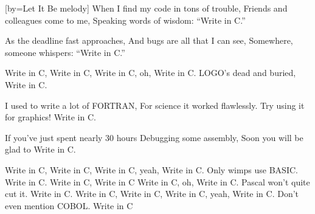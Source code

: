 [by={Let It Be melody}]
\beginverse
When I find my code in tons of trouble,
Friends and colleagues come to me,
Speaking words of wisdom:
``Write in C.''
\endverse

\beginverse
As the deadline fast approaches,
And bugs are all that I can see,
Somewhere, someone whispers:
``Write in C.''
\endverse

\beginchorus
Write in C, Write in C,
Write in C, oh, Write in C.
LOGO's dead and buried,
Write in C.
\endchorus

\beginverse
I used to write a lot of FORTRAN,
For science it worked flawlessly.
Try using it for graphics!
Write in C.
\endverse

\beginverse
If you've just spent nearly 30 hours
Debugging some assembly,
Soon you will be glad to
Write in C.
\endverse

\beginchorus
Write in C, Write in C,
Write in C, yeah, Write in C.
Only wimps use BASIC.
Write in C.
Write in C, Write in C
Write in C, oh, Write in C.
Pascal won't quite cut it.
Write in C.
Write in C, Write in C,
Write in C, yeah, Write in C.
Don't even mention COBOL.
Write in C 
\endchorus
\endsong
